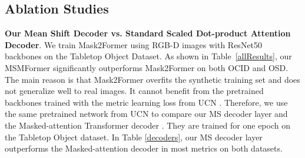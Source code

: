 \documentclass[letterpaper, 10 pt, conference]{ieeeconf}
\begin{document}
\vspace{-2mm}
\subsection{Ablation Studies}
\vspace{-2mm}




\textbf{Our Mean Shift Decoder vs. Standard Scaled Dot-product Attention Decoder}. We train Mask2Former \cite{cheng2022masked} using RGB-D images with ResNet50 backbones on the Tabletop Object Dataset. As shown in Table~\ref{allResults}, our MSMFormer significantly outperforms Mask2Former on both OCID and OSD. The main reason is that Mask2Former overfits the synthetic training set and does not generalize well to real images. It cannot benefit from the pretrained backbones trained with the metric learning loss from UCN \cite{xiang2020learning}. Therefore, we use the same pretrained network from UCN to compare our MS decoder layer and the Masked-attention Transformer decoder \cite{cheng2022masked}. They are trained for one epoch on the Tabletop Object dataset. In Table \ref{decoders}, our MS decoder layer outperforms the Masked-attention decoder in most metrics on both datasets. 
\end{document}
